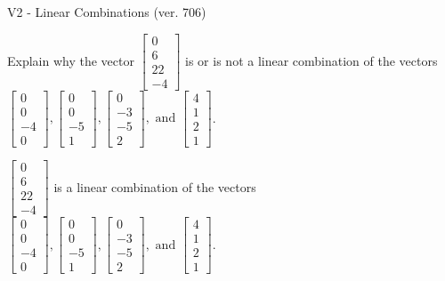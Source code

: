 \begin{exercise}
  \begin{exerciseTitle}V2 - Linear Combinations (ver. 706)\end{exerciseTitle}
  \begin{exerciseStatement}
    Explain why the vector \(\left[\begin{array}{c}
0 \\
6 \\
22 \\
-4
\end{array}\right]\)  is or is not a linear 
	combination of the vectors \(\left[\begin{array}{c}
0 \\
0 \\
-4 \\
0
\end{array}\right] , \left[\begin{array}{c}
0 \\
0 \\
-5 \\
1
\end{array}\right] , \left[\begin{array}{c}
0 \\
-3 \\
-5 \\
2
\end{array}\right] , \text{ and } \left[\begin{array}{c}
4 \\
1 \\
2 \\
1
\end{array}\right]\).
	


  \end{exerciseStatement}
  \begin{exerciseAnswer}
   \(\left[\begin{array}{c}
0 \\
6 \\
22 \\
-4
\end{array}\right]\) 
  	 is  
	a linear combination of the vectors \(\left[\begin{array}{c}
0 \\
0 \\
-4 \\
0
\end{array}\right] , \left[\begin{array}{c}
0 \\
0 \\
-5 \\
1
\end{array}\right] , \left[\begin{array}{c}
0 \\
-3 \\
-5 \\
2
\end{array}\right] , \text{ and } \left[\begin{array}{c}
4 \\
1 \\
2 \\
1
\end{array}\right]\).


\end{exerciseAnswer}
\end{exercise}
